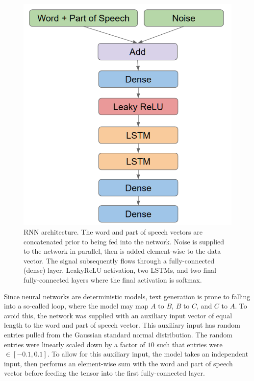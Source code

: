 \documentclass[conference]{IEEEtran}
\begin{document}
\begin{figure}[!htbp]
\caption{RNN architecture.  The word and part of speech vectors are concatenated prior to being fed into the network. Noise is supplied to the network in parallel, then is added element-wise to the data vector. The signal subsequently flows through a fully-connected (dense) layer, LeakyReLU activation, two LSTMs, and two final fully-connected layers where the final activation is softmax.}
\label{fig:model}
\centering
\vspace{2mm}
\includegraphics[scale=0.5]{rnn}
\end{figure}
Since neural networks are deterministic models, text generation is prone to falling into a so-called loop, where the model may map $A$ to $B$, $B$ to $C$, and $C$ to $A$.  To avoid this, the network was supplied with an auxiliary input vector of equal length to the word and part of speech vector. This auxiliary input has random entries pulled from the Gaussian standard normal distribution. The random entries were linearly scaled down by a factor of $10$ such that entries were $\in[-0.1, 0.1]$.  To allow for this auxiliary input, the model takes an independent input, then performs an element-wise sum with the word and part of speech vector before feeding the tensor into the first fully-connected layer.
\end{document}
